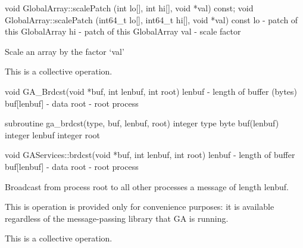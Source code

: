 \documentclass[12pt]{article}
\begin{document}
\begin{cxxapi}
void GlobalArray::scalePatch (int lo[], int hi[], void *val) const;
void GlobalArray::scalePatch (int64_t lo[], int64_t hi[], void *val) const
   lo                                - patch of this GlobalArray           \access{[input]}
   hi                                - patch of this GlobalArray           \access{[input]}
   val                               - scale factor                        \access{[input]}
\end{cxxapi}

\begin{desc}

Scale an array by the factor `val'

This is a collective operation.
\end{desc}


\begin{capi}
void GA_Brdcst(void *buf, int lenbuf, int root)
   lenbuf       - length of buffer (bytes)                                 \access{[input]} 
   buf[lenbuf]  - data                                                      
   root         - root process                                             \access{[input]} 
\end{capi}

\begin{fapi}
subroutine ga_brdcst(type, buf, lenbuf, root)
   integer type                                                            \access{[input]} 
   byte buf(lenbuf)                                                         
   integer lenbuf                                                          \access{[input]} 
   integer root                                                            \access{[input]} 
\end{fapi}

\begin{cxxapi}
void GAServices::brdcst(void *buf, int lenbuf, int root)
   lenbuf         - length of buffer                                       \access{[input]}
   buf[lenbuf]    -  data                                                  
   root           - root process                                           \access{[input]}
\end{cxxapi}

\begin{desc}

Broadcast from process root to all other processes a message of length lenbuf.

This is operation is provided only for convenience purposes: it is available regardless of the message-passing library that GA is running.

This is a collective operation.
\end{desc}
\end{document}
